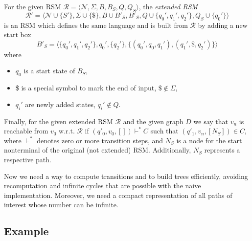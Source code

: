 \begin{definition}
    For the given RSM $\mathcal{R}=\langle \mathcal{N},\Sigma,B,B_S,Q,Q_S\rangle$,
    the \textit{extended RSM} 
    $$\mathcal{R}'=\langle \mathcal{N} \cup \{S'\},\Sigma \cup\{\$\},B \cup {B'_S},B'_S,Q \cup \{q_0',q_1',q_2'\},Q_S \cup \{q_0'\}\rangle$$
    is an RSM which defines the same language and is built from $\mathcal{R}$ by adding a new start box 
    $$B'_S = \langle \{q_0',q_1',q_2'\}, q_0', \{q_2'\}, \{(q_0',q_0,q_1'),(q_1',\$, q_2')\} \rangle$$ where 
    \begin{itemize}
        \item $q_0$ is a start state of $B_S$,
        \item \$ is a special symbol to mark the end of input, $\$ \notin \Sigma$,
        \item $q_i'$ are newly added states, $q_i'\notin Q$.
    \end{itemize}
\end{definition} 

Finally, for the given extended RSM $\mathcal{R}$ and the given graph $D$ we say that $v_n$ is reachable from $v_0$  w.r.t. $\mathcal{R}$ if $(q'_0,v_0,[]) \vdash^* C$ such that $(q'_1,v_n,[N_S]) \in C$, where $\vdash^*$ denotes zero or more transition steps, and $N_S$ is a node for the start nonterminal of the original (not extended) RSM. Additionally, $N_S$ represents a respective path.

Now we need a way to compute transitions and to build trees efficiently, avoiding recomputation and infinite cycles that are possible with the naive implementation.
Moreover, we need a compact representation of all paths of interest whose number can be infinite.

\subsection{Example}\label{section:example_of_rsm}

